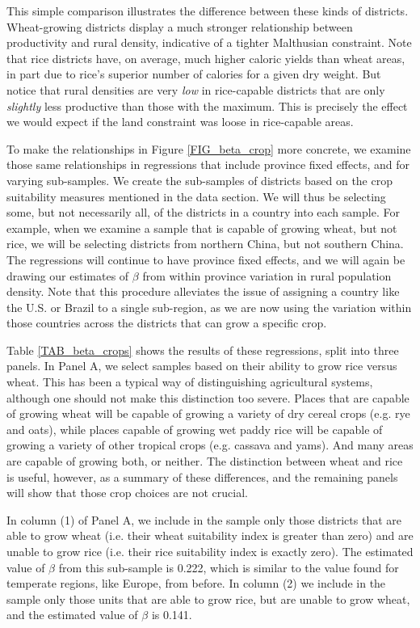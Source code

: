 \documentclass[11pt]{article}
\begin{document}
This simple comparison illustrates the difference between these kinds of districts. Wheat-growing districts display a much stronger relationship between productivity and rural density, indicative of a tighter Malthusian constraint. Note that rice districts have, on average, much higher caloric yields than wheat areas, in part due to rice's superior number of calories for a given dry weight. But notice that rural densities are very \textit{low} in rice-capable districts that are only \textit{slightly} less productive than those with the maximum. This is precisely the effect we would expect if the land constraint was loose in rice-capable areas. 

To make the relationships in Figure \ref{FIG_beta_crop} more concrete, we examine those same relationships in regressions that include province fixed effects, and for varying sub-samples. We create the sub-samples of districts based on the crop suitability measures mentioned in the data section. We will thus be selecting some, but not necessarily all, of the districts in a country into each sample. For example, when we examine a sample that is capable of growing wheat, but not rice, we will be selecting districts from northern China, but not southern China. The regressions will continue to have province fixed effects, and we will again be drawing our estimates of $\beta$ from within province variation in rural population density. Note that this procedure alleviates the issue of assigning a country like the U.S. or Brazil to a single sub-region, as we are now using the variation within those countries across the districts that can grow a specific crop.

Table \ref{TAB_beta_crops} shows the results of these regressions, split into three panels. In Panel A, we select samples based on their ability to grow rice versus wheat. This has been a typical way of distinguishing agricultural systems, although one should not make this distinction too severe. Places that are capable of growing wheat will be capable of growing a variety of dry cereal crops (e.g. rye and oats), while places capable of growing wet paddy rice will be capable of growing a variety of other tropical crops (e.g. cassava and yams). And many areas are capable of growing both, or neither. The distinction between wheat and rice is useful, however, as a summary of these differences, and the remaining panels will show that those crop choices are not crucial.

In column (1) of Panel A, we include in the sample only those districts that are able to grow wheat (i.e. their wheat suitability index is greater than zero) and are unable to grow rice (i.e. their rice suitability index is exactly zero). The estimated value of $\beta$ from this sub-sample is 0.222, which is similar to the value found for temperate regions, like Europe, from before. In column (2) we include in the sample only those units that are able to grow rice, but are unable to grow wheat, and the estimated value of $\beta$ is 0.141.
\end{document}
